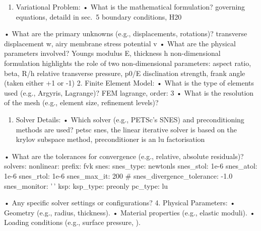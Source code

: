 \documentclass[
  11pt,
]{article}
\providecommand{\tightlist}{%
  \setlength{\itemsep}{0pt}\setlength{\parskip}{0pt}}
\begin{document}
\begin{enumerate}
\def\labelenumi{\arabic{enumi}.}
\tightlist
\item
  Variational Problem: • What is the mathematical formulation? governing
  equations, detaild in sec.~5 boundary conditions, H20
\end{enumerate}

• What are the primary unknowns (e.g., displacements, rotations)?
transverse displacement w, airy membrane stress potential v • What are
the physical parameters involved? Youngs modulus E, thickness h
non-dimensional formulation highlights the role of two non-dimensional
parameters: aspect ratio, beta, R/h relative transverse pressure, p0/E
disclination strength, frank angle (taken either +1 or -1) 2. Finite
Element Model: • What is the type of elements used (e.g., Argyris,
Lagrange)? FEM lagrange, order: 3 • What is the resolution of the mesh
(e.g., element size, refinement levels)?

\begin{enumerate}
\def\labelenumi{\arabic{enumi}.}
\setcounter{enumi}{2}
\tightlist
\item
  Solver Details: • Which solver (e.g., PETSc's SNES) and
  preconditioning methods are used? petsc snes, the linear iterative
  solver is based on the krylov subspace method, preconditioner is an lu
  factorisation
\end{enumerate}

• What are the tolerances for convergence (e.g., relative, absolute
residuals)? solvers: nonlinear: prefix: fvk snes: snes\_type: newtonls
snes\_stol: 1e-6 snes\_atol: 1e-6 snes\_rtol: 1e-6 snes\_max\_it: 200 \#
snes\_divergence\_tolerance: -1.0 snes\_monitor: '\,' ksp: ksp\_type:
preonly pc\_type: lu

• Any specific solver settings or configurations? 4. Physical
Parameters: • Geometry (e.g., radius, thickness). • Material properties
(e.g., elastic moduli). • Loading conditions (e.g., surface pressure, ).
\end{document}
